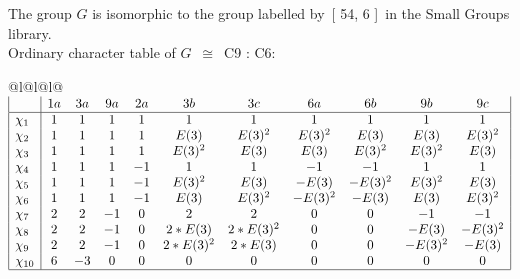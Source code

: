 \documentclass[varwidth=\maxdimen,border=10]{standalone}
\begin{document}
The group $G$ is isomorphic to the group labelled by\ [ 54, 6 ]\ in the Small Groups library.\\
Ordinary character table of $G$\ $\cong$\ C9 : C6:\\
\begin{center}
\begin{tabular}{@{}l@{}l@{}l@{}}
\hline
\(\begin{array}{|l|cccccccccc|}
  & 1a & 3a & 9a & 2a & 3b & 3c & 6a & 6b & 9b & 9c\\ \hline
\chi_{1} & 1 & 1 & 1 & 1 & 1 & 1 & 1 & 1 & 1 & 1\\
\chi_{2} & 1 & 1 & 1 & 1 & E(3) & E(3)^{2} & E(3)^{2} & E(3) & E(3) & E(3)^{2}\\
\chi_{3} & 1 & 1 & 1 & 1 & E(3)^{2} & E(3) & E(3) & E(3)^{2} & E(3)^{2} & E(3)\\
\chi_{4} & 1 & 1 & 1 & -1 & 1 & 1 & -1 & -1 & 1 & 1\\
\chi_{5} & 1 & 1 & 1 & -1 & E(3)^{2} & E(3) & -E(3) & -E(3)^{2} & E(3)^{2} & E(3)\\
\chi_{6} & 1 & 1 & 1 & -1 & E(3) & E(3)^{2} & -E(3)^{2} & -E(3) & E(3) & E(3)^{2}\\
\chi_{7} & 2 & 2 & -1 & 0 & 2 & 2 & 0 & 0 & -1 & -1\\
\chi_{8} & 2 & 2 & -1 & 0 & 2*E(3) & 2*E(3)^{2} & 0 & 0 & -E(3) & -E(3)^{2}\\
\chi_{9} & 2 & 2 & -1 & 0 & 2*E(3)^{2} & 2*E(3) & 0 & 0 & -E(3)^{2} & -E(3)\\
\chi_{10} & 6 & -3 & 0 & 0 & 0 & 0 & 0 & 0 & 0 & 0\\
\hline
\end{array}\)\\
\end{tabular}
\end{center}
\end{document}
